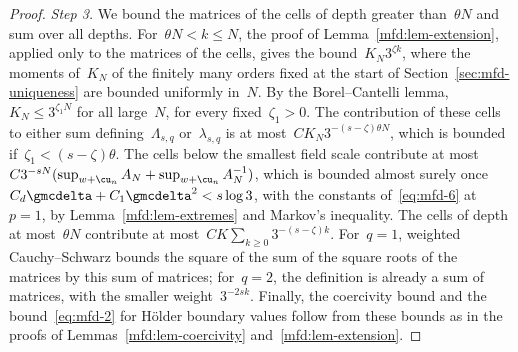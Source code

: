 \documentclass[11pt]{amsart}
\begin{document}
\begin{proof}
\smallskip

\emph{Step 3.} We bound the matrices of the cells of depth greater than~$\theta N$ and sum over all depths. For~$\theta N<k\leq N$, the proof of Lemma~\ref{mfd:lem-extension}, applied only to the matrices of the cells, gives the bound~$K_N3^{\zeta k}$, where the moments of~$K_N$ of the finitely many orders fixed at the start of Section~\ref{sec:mfd-uniqueness} are bounded uniformly in~$N$. By the Borel--Cantelli lemma,~$K_N\leq3^{\zeta_1 N}$ for all large~$N$, for every fixed~$\zeta_1>0$. The contribution of these cells to either sum defining~$\Lambda_{s,q}$ or~$\lambda_{s,q}$ is at most~$CK_N3^{-(s-\zeta)\theta N}$, which is bounded if~$\zeta_1<(s-\zeta)\theta$. The cells below the smallest field scale contribute at most~$C3^{-sN}(\sup_{w+\cu_n}A_N+\sup_{w+\cu_n}A_N^{-1})$, which is bounded almost surely once~$C_d\gmcdelta+C_1\gmcdelta^2<s\log3$, with the constants of~\eqref{eq:mfd-6} at~$p=1$, by Lemma~\ref{mfd:lem-extremes} and Markov's inequality. The cells of depth at most~$\theta N$ contribute at most~$CK\sum_{k\geq0}3^{-(s-\zeta)k}$. For~$q=1$, weighted Cauchy--Schwarz bounds the square of the sum of the square roots of the matrices by this sum of matrices; for~$q=2$, the definition is already a sum of matrices, with the smaller weight~$3^{-2sk}$. Finally, the coercivity bound and the bound~\eqref{eq:mfd-2} for H\"older boundary values follow from these bounds as in the proofs of Lemmas~\ref{mfd:lem-coercivity} and~\ref{mfd:lem-extension}.
\end{proof}
\end{document}
